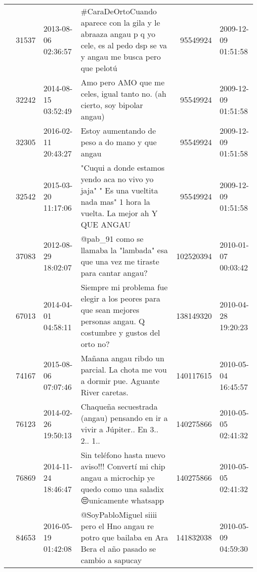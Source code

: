 \begin{tabular}{llllrl}
           & 31537   & 2013-08-06 02:36:57 &                  \#CaraDeOrtoCuando aparece con la gila y le abraaza angau p q yo cele, es al pedo dsp se va y angau me busca pero que pelotú &    95549924 & 2009-12-09 01:51:58 \\
           & 32242   & 2014-08-15 03:52:49 &                                                                    Amo pero AMO que me celes, igual tanto no. (ah cierto, soy bipolar angau) &    95549924 & 2009-12-09 01:51:58 \\
           & 32305   & 2016-02-11 20:43:27 &                                                                                               Estoy aumentando de peso a do mano y que angau &    95549924 & 2009-12-09 01:51:58 \\
           & 32542   & 2015-03-20 11:17:06 &                     "Cuqui a donde estamos yendo aca no vivo yo jaja" " Es una vueltita nada mas"  1 hora la vuelta. La mejor ah Y QUE ANGAU &    95549924 & 2009-12-09 01:51:58 \\
           & 37083   & 2012-08-29 18:02:07 &                                                           @pab\_91 como se llamaba la "lambada" esa que una vez me tiraste para cantar angau? &   102520394 & 2010-01-07 00:03:42 \\
           & 67013   & 2014-04-01 04:58:11 &                          Siempre mi problema fue elegir a los peores para que sean mejores personas angau. Q costumbre y gustos del orto no? &   138149320 & 2010-04-28 19:20:23 \\
           & 74167   & 2015-08-06 07:07:46 &                                                          Mañana angau ribdo un parcial. La chota me vou a dormir pue. Aguante River caretas. &   140117615 & 2010-05-04 16:45:57 \\
           & 76123   & 2014-02-26 19:50:13 &                                                               Chaqueña secuestrada (angau) pensando en ir a vivir a Júpiter.. En 3.. 2.. 1.. &   140275866 & 2010-05-05 02:41:32 \\
           & 76869   & 2014-11-24 18:46:47 &                          Sin teléfono hasta nuevo aviso!!! Convertí mi chip angau a microchip ye quedo como una saladix 😔unicamente whatsapp &   140275866 & 2010-05-05 02:41:32 \\
           & 84653   & 2016-05-19 01:42:08 &                                @SoyPabloMiguel siiii pero el Hno angau re potro que bailaba en Ara Bera el año pasado se cambio a sapucay 👊🏻 &   141832038 & 2010-05-09 04:59:30 \\

\end{tabular}
